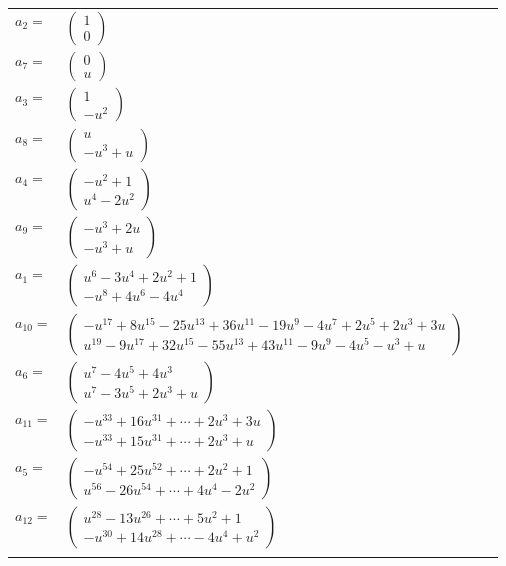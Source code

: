 \documentclass[1p]{elsarticle_modified}
\theoremstyle{definition}
\begin{document}
\begin{tabular}{m{7pt} m{180pt} m{7pt} m{180pt} }
\flushright $a_{2}=$&$\begin{pmatrix}1\\0\end{pmatrix}$ \\
\flushright $a_{7}=$&$\begin{pmatrix}0\\u\end{pmatrix}$ \\
\flushright $a_{3}=$&$\begin{pmatrix}1\\- u^2\end{pmatrix}$ \\
\flushright $a_{8}=$&$\begin{pmatrix}u\\- u^3+u\end{pmatrix}$ \\
\flushright $a_{4}=$&$\begin{pmatrix}- u^2+1\\u^4-2 u^2\end{pmatrix}$ \\
\flushright $a_{9}=$&$\begin{pmatrix}- u^3+2 u\\- u^3+u\end{pmatrix}$ \\
\flushright $a_{1}=$&$\begin{pmatrix}u^6-3 u^4+2 u^2+1\\- u^8+4 u^6-4 u^4\end{pmatrix}$ \\
\flushright $a_{10}=$&$\begin{pmatrix}- u^{17}+8 u^{15}-25 u^{13}+36 u^{11}-19 u^9-4 u^7+2 u^5+2 u^3+3 u\\u^{19}-9 u^{17}+32 u^{15}-55 u^{13}+43 u^{11}-9 u^9-4 u^5- u^3+u\end{pmatrix}$ \\
\flushright $a_{6}=$&$\begin{pmatrix}u^7-4 u^5+4 u^3\\u^7-3 u^5+2 u^3+u\end{pmatrix}$ \\
\flushright $a_{11}=$&$\begin{pmatrix}- u^{33}+16 u^{31}+\cdots+2 u^3+3 u\\- u^{33}+15 u^{31}+\cdots+2 u^3+u\end{pmatrix}$ \\
\flushright $a_{5}=$&$\begin{pmatrix}- u^{54}+25 u^{52}+\cdots+2 u^2+1\\u^{56}-26 u^{54}+\cdots+4 u^4-2 u^2\end{pmatrix}$ \\
\flushright $a_{12}=$&$\begin{pmatrix}u^{28}-13 u^{26}+\cdots+5 u^2+1\\- u^{30}+14 u^{28}+\cdots-4 u^4+u^2\end{pmatrix}$\\&\end{tabular}
\end{document}
